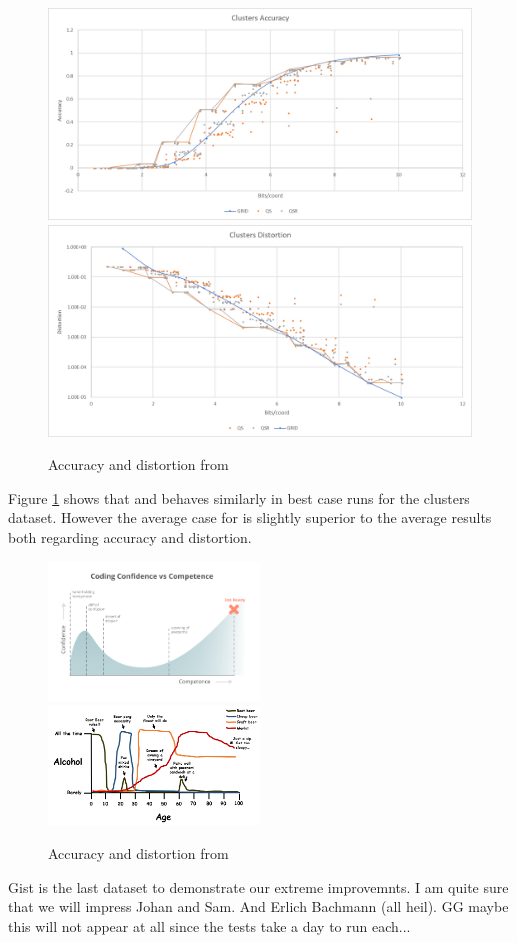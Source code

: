\begin{figure}[h!]
\includegraphics[width=\textwidth]{figures/graphs/clusters_accuracy}
\includegraphics[width=\textwidth]{figures/graphs/clusters_distortion}
\caption{Accuracy and distortion from \clust{}}
\label{fig:graph clust}
\end{figure}
Figure \ref{fig:graph clust} shows that \qs{} and \qsr{} behaves similarly in best case runs for the clusters dataset. However the average case for \qsr{} is slightly superior to the \qs{} average results both regarding accuracy and distortion.
\clearpage{}

\begin{figure}[h]
\includegraphics[width=0.5\textwidth]{figures/coding_graph}
\includegraphics[width=0.5\textwidth]{figures/alcohol_graph}
\caption{Accuracy and distortion from \gist{}}
\label{fig:graph gist}
\end{figure}
Gist is the last dataset to demonstrate our extreme improvemnts. I am quite sure that we will impress Johan and Sam. And Erlich Bachmann (all heil). GG maybe this will not appear at all since the tests take a day to run each...

